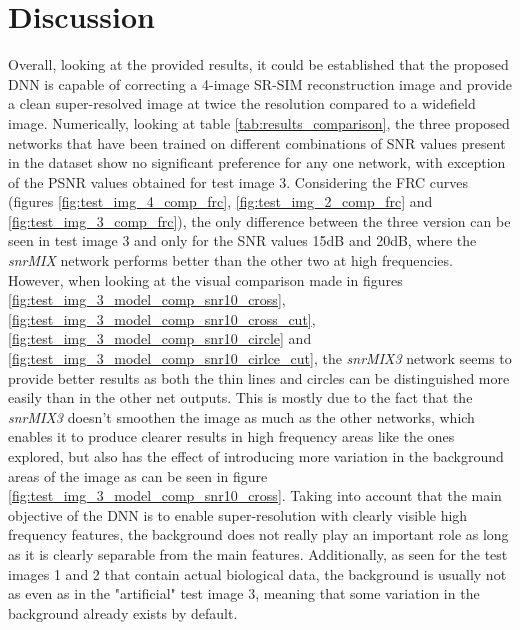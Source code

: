 \documentclass[conference]{IEEEtran}
\begin{document}
\section{Discussion}
Overall, looking at the provided results, it could be established that the proposed DNN is capable of correcting a 4-image SR-SIM reconstruction image and provide a clean super-resolved image at twice the resolution compared to a widefield image. Numerically, looking at table \ref{tab:results_comparison}, the three proposed networks that have been trained on different combinations of SNR values present in the dataset show no significant preference for any one network, with exception of the PSNR values obtained for test image 3. Considering the FRC curves (figures \ref{fig:test_img_4_comp_frc}, \ref{fig:test_img_2_comp_frc} and \ref{fig:test_img_3_comp_frc}), the only difference between the three version can be seen in test image 3 and only for the SNR values 15dB and 20dB, where the \textit{snrMIX} network performs better than the other two at high frequencies. However, when looking at the visual comparison made in figures \ref{fig:test_img_3_model_comp_snr10_cross}, \ref{fig:test_img_3_model_comp_snr10_cross_cut}, \ref{fig:test_img_3_model_comp_snr10_circle} and \ref{fig:test_img_3_model_comp_snr10_cirlce_cut}, the \textit{snrMIX3} network seems to provide better results as both the thin lines and circles can be distinguished more easily than in the other net outputs. This is mostly due to the fact that the \textit{snrMIX3} doesn't smoothen the image as much as the other networks, which enables it to produce clearer results in high frequency areas like the ones explored, but also has the effect of introducing more variation in the background areas of the image as can be seen in figure \ref{fig:test_img_3_model_comp_snr10_cross}. Taking into account that the main objective of the DNN is to enable super-resolution with clearly visible high frequency features, the background does not really play an important role as long as it is clearly separable from the main features. Additionally, as seen for the test images 1 and 2 that contain actual biological data, the background is usually not as even as in the "artificial" test image 3, meaning that some variation in the background already exists by default.
\end{document}
